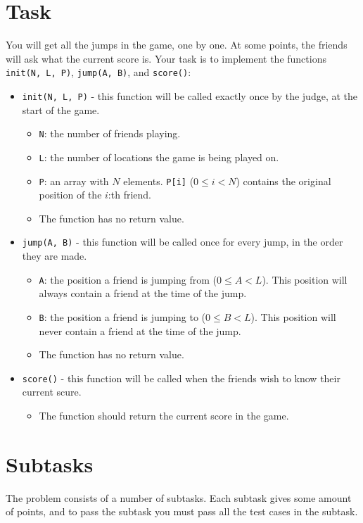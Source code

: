 \section*{Task}
You will get all the jumps in the game, one by one. At some points, the friends will ask what the current score is. Your task is to
implement the functions \texttt{init(N, L, P)}, \texttt{jump(A, B)}, and \texttt{score()}:
\begin{itemize}
  \item \texttt{init(N, L, P)} - this function will be called exactly once by the judge, at the start of the game.
  \begin{itemize}
    \item \texttt{N}: the number of friends playing.
    \item \texttt{L}: the number of locations the game is being played on.
    \item \texttt{P}: an array with $N$ elements. \texttt{P[i]} ($0 \le i < N$) contains the original position of the $i$:th friend.
    \item The function has no return value.
  \end{itemize}

  \item \texttt{jump(A, B)} - this function will be called once for every jump, in the order they are made.
  \begin{itemize}
    \item \texttt{A}: the position a friend is jumping from ($0 \le A < L$). This position will always contain a friend at the time of the jump.
    \item \texttt{B}: the position a friend is jumping to ($0 \le B < L$). This position will never contain a friend at the time of the jump.
    \item The function has no return value.
  \end{itemize}

  \item \texttt{score()} - this function will be called when the friends wish to know their current scure.
  \begin{itemize}
    \item The function should return the current score in the game.
  \end{itemize}

\end{itemize}

\section*{Subtasks}
The problem consists of a number of subtasks. Each subtask gives some amount of points, and to pass
the subtask you must pass all the test cases in the subtask.

